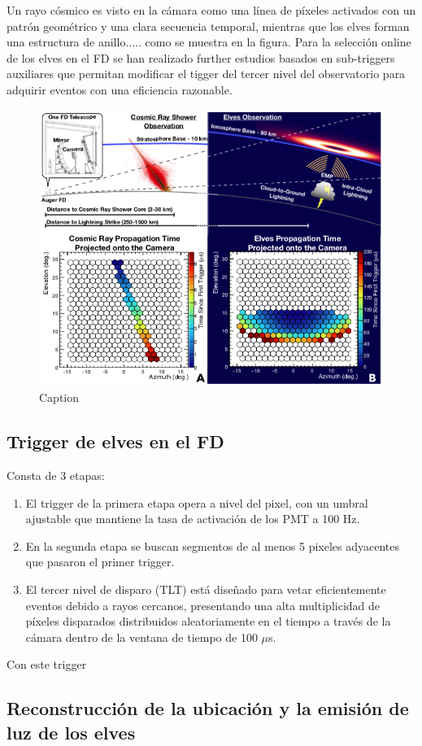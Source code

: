 \documentclass[12pt,oneside,openany,letter]{book}
\begin{document}
Un rayo c\'osmico es visto en la c\'amara como una l\'inea de p\'ixeles activados con un patr\'on geom\'etrico y una clara secuencia temporal, mientras que los elves forman una estructura de anillo..... como se muestra en la figura. Para la selecci\'on online de los elves en el FD se han realizado further estudios basados en sub-triggers auxiliares que permitan modificar el tigger del tercer nivel del observatorio para adquirir eventos con una eficiencia razonable. 
\begin{figure}
    \centering
    \includegraphics[scale=0.5]{figures/cr_vs_elves.png}
    \caption{Caption}
    \label{fig:my_label}
\end{figure}
\subsection{Trigger de elves en el FD}
Consta de 3 etapas:
\begin{enumerate}
    \item El trigger de la primera etapa opera a nivel del pixel, con un umbral ajustable que mantiene la tasa de activaci\'on de los PMT a 100 Hz.
    \item En la segunda etapa se buscan segmentos de al menos 5 pixeles adyacentes que pasaron el primer trigger. 
    \item El tercer nivel de disparo (TLT) está diseñado para vetar eficientemente eventos debido a rayos cercanos, presentando una alta multiplicidad de píxeles disparados distribuidos aleatoriamente en el tiempo a través de la cámara dentro de la ventana de tiempo de 100 $\mu$s.
\end{enumerate}

Con este trigger 



\subsection{Reconstrucci\'on de la ubicaci\'on y la emisi\'on de luz de los elves}



\end{document}

